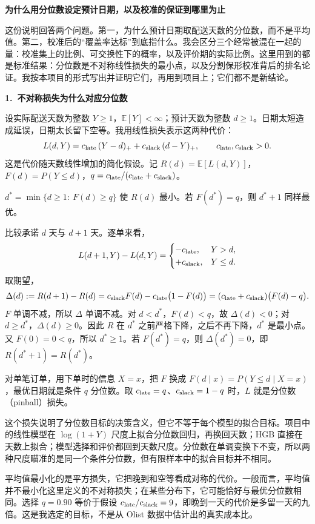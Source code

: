 \documentclass[11pt]{article}
\begin{document}
{\Large\textbf{为什么用分位数设定预计日期，以及校准的保证到哪里为止}}

\medskip
这份说明回答两个问题。第一，为什么预计日期取配送天数的分位数，而不是平均值。第二，校准后的“覆盖率达标”到底指什么。我会区分三个经常被混在一起的量：校准集上的比例、可交换性下的概率，以及评价期的实际比例。这里用到的都是标准结果：分位数是不对称线性损失的最小点，以及分割保形校准背后的排名论证。我按本项目的形式写出并证明它们，再用到项目上；它们都不是新结论。

\bigskip
\textbf{1.\ 不对称损失为什么对应分位数}

设实际配送天数为整数 \(Y\ge1\)，\(\mathbb E[Y]<\infty\)；预计天数为整数 \(d\ge1\)。日期太短造成延误，日期太长留下空等。我用线性损失表示这两种代价：
\[
L(d,Y)=c_{\text{late}}\,(Y-d)_+ +c_{\text{slack}}\,(d-Y)_+,\qquad c_{\text{late}},c_{\text{slack}}>0 .
\]
这是代价随天数线性增加的简化假设。记 \(R(d)=\mathbb E[L(d,Y)]\)，\(F(d)=P(Y\le d)\)，\(q=c_{\text{late}}/(c_{\text{late}}+c_{\text{slack}})\)。

\begin{prop}
\(d^\ast=\min\{d\ge1:\ F(d)\ge q\}\) 使 \(R(d)\) 最小。若 \(F(d^\ast)=q\)，则 \(d^\ast+1\) 同样最优。
\end{prop}

\begin{pf}
比较承诺 \(d\) 天与 \(d+1\) 天。逐单来看，
\[
L(d+1,Y)-L(d,Y)=
\begin{cases}
-c_{\text{late}}, & Y>d,\\
+c_{\text{slack}}, & Y\le d .
\end{cases}
\]
取期望，
\[
\Delta(d):=R(d+1)-R(d)=c_{\text{slack}} F(d)-c_{\text{late}}\bigl(1-F(d)\bigr)=(c_{\text{late}}+c_{\text{slack}})\bigl(F(d)-q\bigr).
\]
\(F\) 单调不减，所以 \(\Delta\) 单调不减。对 \(d<d^\ast\)，\(F(d)<q\)，故 \(\Delta(d)<0\)；对 \(d\ge d^\ast\)，\(\Delta(d)\ge0\)。因此 \(R\) 在 \(d^\ast\) 之前严格下降，之后不再下降，\(d^\ast\) 是最小点。又 \(F(0)=0<q\)，所以 \(d^\ast\ge1\)。若 \(F(d^\ast)=q\)，则 \(\Delta(d^\ast)=0\)，即 \(R(d^\ast+1)=R(d^\ast)\)。
\end{pf}

对单笔订单，用下单时的信息 \(X=x\)，把 \(F\) 换成 \(F(d\mid x)=P(Y\le d\mid X=x)\)，最优日期就是条件 \(q\) 分位数。取 \(c_{\text{late}}=q\)、\(c_{\text{slack}}=1-q\) 时，\(L\) 就是分位数（pinball）损失。

这个损失说明了分位数目标的决策含义，但它不等于每个模型的拟合目标。项目中的线性模型在 \(\log(1+Y)\) 尺度上拟合分位数回归，再换回天数；HGB 直接在天数上拟合；模型选择和评价都回到天数尺度。分位数在单调变换下不变，所以两种尺度瞄准的是同一个条件分位数，但有限样本中的拟合目标并不相同。

平均值最小化的是平方损失，它把晚到和空等看成对称的代价。一般而言，平均值并不最小化这里定义的不对称损失；在某些分布下，它可能恰好与最优分位数相同。选择 \(q=0.90\) 等价于假设 \(c_{\text{late}}/c_{\text{slack}}=9\)，即晚到一天的代价是多留一天的九倍。这是我选定的目标，不是从 Olist 数据中估计出的真实成本比。
\end{document}
